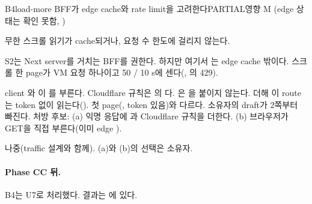 \begin{checkitem}{\ckopen}{B4}{load-more BFF가 edge cache와 rate limit을 고려한다}{PARTIAL\ckdot{}영향 M (edge 상태는 확인 못함, )}
  \item[What] 무한 스크롤 읽기가 cache되거나, 요청 수 한도에 걸리지 않는다.
  \item[Why] S2는 Next server를 거치는 BFF를 권한다. 하지만 여기서 는 edge cache 밖이다. 스크롤 한 page가 VM 요청 하나이고 50 / 10 s에 센다(, 의 429).
  \item[How] client 와 이 를 부른다. Cloudflare 규칙은 의 다. 은 을 붙이지 않는다. 더해 이 route는 token 없이 읽는다(). 첫 page(, token 있음)와 다르다. 소유자의 draft가 2쪽부터 빠진다. 처방 후보: (a) 익명 응답에 과 Cloudflare 규칙을 더한다. (b) 브라우저가  GET을 직접 부른다(이미 edge ).
  \item[When] 나중(traffic 설계와 함께). (a)와 (b)의 선택은 소유자.
\end{checkitem}

\paragraph{Phase CC 뒤.}
B4는 U7로 처리했다. 결과는 에 있다.
